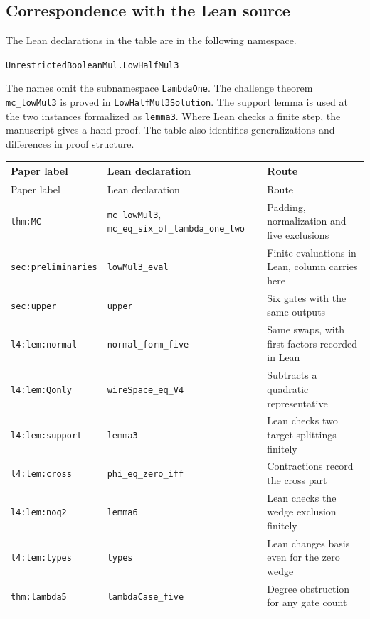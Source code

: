 \documentclass[11pt,a4paper]{article}
\theoremstyle{plain}
\theoremstyle{remark}
\theoremstyle{plain}
\begin{document}
\subsection{Correspondence with the Lean source}
The Lean declarations in the table are in the following namespace.
\begin{center}
\texttt{UnrestrictedBooleanMul.LowHalfMul3}
\end{center}
The names omit the subnamespace \nolinkurl{LambdaOne}. The challenge theorem \nolinkurl{mc_lowMul3}
is proved in \nolinkurl{LowHalfMul3Solution}. The support lemma is used at the
two instances formalized as \nolinkurl{lemma3}. Where Lean checks a finite step,
the manuscript gives a hand proof. The table also identifies generalizations
and differences in proof structure.

{\small
\begin{longtable}{@{}>{\raggedright\arraybackslash}p{.21\linewidth}
>{\raggedright\arraybackslash}p{.42\linewidth}
>{\raggedright\arraybackslash}p{.31\linewidth}@{}}
\toprule
Paper label & Lean declaration & Route \\
\midrule
\endfirsthead
\toprule
Paper label & Lean declaration & Route \\
\midrule
\endhead
\bottomrule
\endfoot
\nolinkurl{thm:MC} & \nolinkurl{mc_lowMul3}, \nolinkurl{mc_eq_six_of_lambda_one_two} & Padding, normalization and five exclusions \\
\nolinkurl{sec:preliminaries} & \nolinkurl{lowMul3_eval} & Finite evaluations in Lean, column carries here \\
\nolinkurl{sec:upper} & \nolinkurl{upper} & Six gates with the same outputs \\
\nolinkurl{l4:lem:normal} & \nolinkurl{normal_form_five} & Same swaps, with first factors recorded in Lean \\
\nolinkurl{l4:lem:Qonly} & \nolinkurl{wireSpace_eq_V4} & Subtracts a quadratic representative \\
\nolinkurl{l4:lem:support} & \nolinkurl{lemma3} & Lean checks two target splittings finitely \\
\nolinkurl{l4:lem:cross} & \nolinkurl{phi_eq_zero_iff} & Contractions record the cross part \\
\nolinkurl{l4:lem:noq2} & \nolinkurl{lemma6} & Lean checks the wedge exclusion finitely \\
\nolinkurl{l4:lem:types} & \nolinkurl{types} & Lean changes basis even for the zero wedge \\
\nolinkurl{thm:lambda5} & \nolinkurl{lambdaCase_five} & Degree obstruction for any gate count \\

\end{longtable}}
\end{document}
